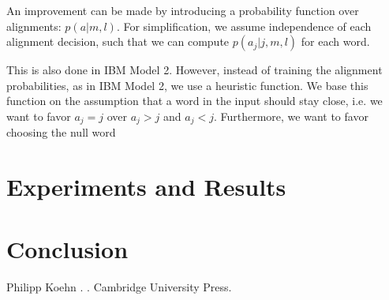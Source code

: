 \documentclass[11pt]{article}
\begin{document}
An improvement can be made by introducing a probability function over alignments: $p(a|m,l)$. 
For simplification, we assume independence of each alignment decision, such that we can compute $p(a_j|j,m,l)$ for each word.

This is also done in IBM Model 2. However,  instead of training the alignment probabilities, as in IBM Model 2, we use a heuristic function. We base this function on the assumption that a word in the input should stay close, i.e. we want to favor $a_j=j$ over $a_j>j$ and $a_j<j$. Furthermore, we want to favor choosing the null word %

\section{Experiments and Results}
\label{Eval}

\section{Conclusion}
\label{Concl}

\begin{thebibliography}{}
\bibitem[1]{}
Philipp Koehn
.
.
\newblock Cambridge University Press.

\end{thebibliography}
\end{document}
